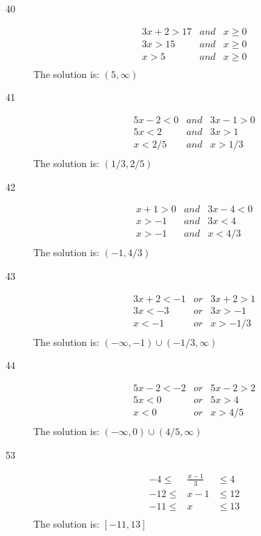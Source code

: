 \documentclass[fleqn,addpoints]{exam}
\begin{document}
\begin{description}
\item[40]
\begin{eqnarray*}
  3x + 2 > 17 &and& x \geq 0 \\
  3x > 15 &and& x \geq 0 \\
  x > 5 &and& x \geq 0 \\
\end{eqnarray*}
The solution is: \( (5, \infty) \)

\item[41]
\begin{eqnarray*}
  5x - 2 < 0 &and& 3x - 1 > 0 \\
  5x < 2 &and& 3x > 1 \\
  x < 2/5 &and& x > 1/3 \\
\end{eqnarray*}
The solution is: \( (1/3, 2/5) \)

\item[42]
\begin{eqnarray*}
  x + 1 > 0 &and& 3x - 4 < 0 \\
  x > -1 &and& 3x < 4 \\
  x > -1 &and& x < 4/3 \\
\end{eqnarray*}
The solution is: \( (-1, 4/3) \)

\item[43]
\begin{eqnarray*}
  3x + 2 < -1 &or& 3x + 2 > 1 \\
  3x < -3 &or& 3x > -1 \\
  x < -1 &or& x > -1/3 \\
\end{eqnarray*}
The solution is: \( (-\infty, -1) \cup (-1/3, \infty) \)

\item[44]
\begin{eqnarray*}
  5x - 2 < -2 &or& 5x - 2 > 2 \\
  5x < 0 &or& 5x > 4 \\
  x < 0 &or& x > 4/5 \\
\end{eqnarray*}
The solution is: \( (-\infty, 0) \cup (4/5, \infty) \)

\item[53]
\begin{eqnarray*}
  -4 \leq & \frac{x - 1}{3} & \leq 4 \\
  -12 \leq & x - 1 & \leq 12 \\
  -11 \leq & x & \leq 13 \\
\end{eqnarray*}
The solution is: \( [-11, 13] \)


\end{description}
\end{document}
